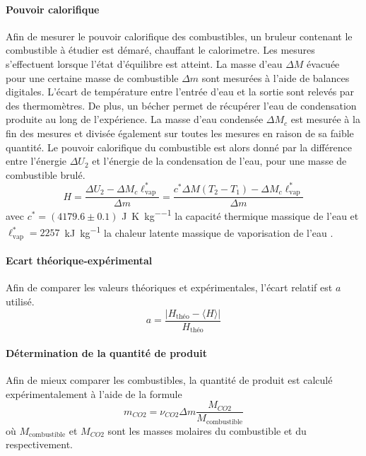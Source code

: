 \paragraph*{Pouvoir calorifique}
Afin de mesurer le pouvoir calorifique des combustibles, un bruleur contenant le combustible à étudier est démaré, chauffant le calorimetre. Les mesures s'effectuent lorsque l'état d'équilibre est atteint. La masse d'eau \(\Delta M\) évacuée pour une certaine masse de combustible \(\Delta m\) sont mesurées à l'aide de balances digitales. L'écart de température entre l'entrée d'eau et la sortie sont relevés par des thermomètres. De plus, un bécher permet de récupérer l'eau de condensation produite au long de l'expérience. La masse d'eau condensée \(\Delta M_c\) est mesurée à la fin des mesures et divisée également sur toutes les mesures en raison de sa faible quantité. Le pouvoir calorifique du combustible est alors donné par la différence entre l'énergie \(\Delta U_2\) et l'énergie de la condensation de l'eau, pour une masse de combustible brulé.
\begin{equation}
    H = \frac{\Delta U_2 - \Delta M_c \ell_\textrm{vap}^*}{\Delta m} = \frac{c^* \Delta M (T_2 - T_1) - \Delta M_c \ell_\textrm{vap}^*}{\Delta m}
    \label{eq:pouvoir_calorifique}
\end{equation}
avec \(c^* = (4179.6 \pm 0.1)\) \si{\joule\per\kelvin\per\kilo\gram} la capacité thermique massique de l'eau \cite{capacite-eau} et \mbox{\(\ell_\textrm{vap}^* = 2257\) \si{\kilo\joule\per\kilo\gram}} la chaleur latente massique de vaporisation de l'eau \cite{notice}.

\paragraph*{Ecart théorique-expérimental}
Afin de comparer les valeurs théoriques et expérimentales, l'écart relatif est \(a\) utilisé.
\begin{equation}
    a = \frac{ |H_\textrm{théo} - \langle H \rangle| }{ H_\textrm{théo} }
    \label{eq:ecart_rel}
\end{equation}

\paragraph*{Détermination de la quantité de  produit}
Afin de mieux comparer les combustibles, la quantité de  produit est calculé expérimentalement à l'aide de la formule
\begin{equation}
    m_{CO2} = \nu_{CO2} \Delta m \frac{M_{CO2}}{M_\textrm{combustible}}
    \label{eq:masse_co2}
\end{equation}
où \(M_\textrm{combustible}\) et \(M_{CO2}\) sont les masses molaires du combustible et du  respectivement.
